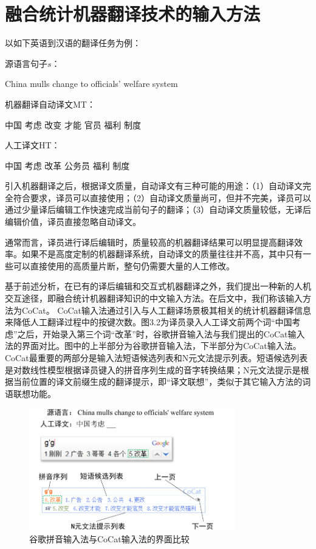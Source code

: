 \section{融合统计机器翻译技术的输入方法}

以如下英语到汉语的翻译任务为例：

\begin{center}
	\begin{boxedminipage}[h]{0.85\linewidth}
		源语言句子$s$：
		
		\quad \quad China mulls change to officials' welfare system
		
		机器翻译自动译文MT：
		
		\quad \quad 中国 考虑 改变 才能 官员 福利 制度
		
		人工译文HT：
		
		\quad \quad 中国 考虑 改革 公务员 福利 制度
	\end{boxedminipage}
\end{center}

引入机器翻译之后，根据译文质量，自动译文有三种可能的用途：（1）自动译文完全符合要求，译员可以直接使用；（2）自动译文质量尚可，但并不完美，译员可以通过少量译后编辑工作快速完成当前句子的翻译；（3）自动译文质量较低，无译后编辑价值，译员直接忽略自动译文。

通常而言，译员进行译后编辑时，质量较高的机器翻译结果可以明显提高翻译效率。如果不是高度定制的机器翻译系统，自动译文的质量往往并不高，其中只有一些可以直接使用的高质量片断，整句仍需要大量的人工修改。

基于前述分析，在已有的译后编辑和交互式机器翻译之外，我们提出一种新的人机交互途径，即融合统计机器翻译知识的中文输入方法。在后文中，我们称该输入方法为CoCat。
CoCat输入法通过引入与人工翻译场景极其相关的统计机器翻译信息来降低人工翻译过程中的按键次数。图3.2为译员录入人工译文前两个词“中国考虑”之后，开始录入第三个词“改革”时，谷歌拼音输入法与我们提出的CoCat输入法的界面对比。图中的上半部分为谷歌拼音输入法，下半部分为CoCat输入法。CoCat最重要的两部分是输入法短语候选列表和N元文法提示列表。短语候选列表是对数线性模型根据译员键入的拼音序列生成的音字转换结果；N元文法提示是根据当前位置的译文前缀生成的翻译提示，即“译文联想”，类似于其它输入方法的词语联想功能。

\begin{figure}[tb]
	\centering
	\includegraphics[width=0.8\textwidth]{Figure/Figure_3_2.pdf}
	\caption{谷歌拼音输入法与CoCat输入法的界面比较}
	\label{Fig_google_cocat_compare}
\end{figure}

